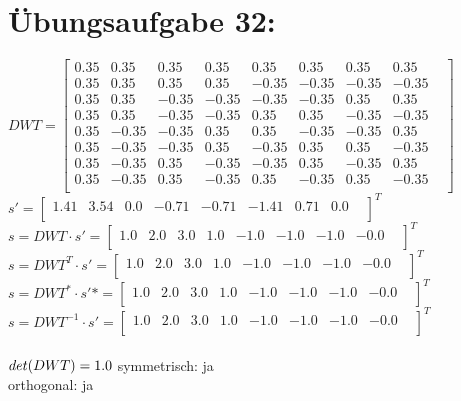 

	\section*{Übungsaufgabe 32:}
	
	$
	DWT =
	\begin{bmatrix}
	0.35 & 0.35 & 0.35 & 0.35 & 0.35 & 0.35 & 0.35 & 0.35 & \\
	0.35 & 0.35 & 0.35 & 0.35 & -0.35 & -0.35 & -0.35 & -0.35 & \\
	0.35 & 0.35 & -0.35 & -0.35 & -0.35 & -0.35 & 0.35 & 0.35 & \\
	0.35 & 0.35 & -0.35 & -0.35 & 0.35 & 0.35 & -0.35 & -0.35 & \\
	0.35 & -0.35 & -0.35 & 0.35 & 0.35 & -0.35 & -0.35 & 0.35 & \\
	0.35 & -0.35 & -0.35 & 0.35 & -0.35 & 0.35 & 0.35 & -0.35 & \\
	0.35 & -0.35 & 0.35 & -0.35 & -0.35 & 0.35 & -0.35 & 0.35 & \\
	0.35 & -0.35 & 0.35 & -0.35 & 0.35 & -0.35 & 0.35 & -0.35 & \\
	\end{bmatrix}
	$ \\ $
	s' =
	\begin{bmatrix}
	1.41 & 3.54 & 0.0 & -0.71 & -0.71 & -1.41 & 0.71 & 0.0 & \\
	\end{bmatrix}
	^T $ \\ $
	s = DWT \cdot s' =
	\begin{bmatrix}
	1.0 & 2.0 & 3.0 & 1.0 & -1.0 & -1.0 & -1.0 & -0.0 & \\
	\end{bmatrix}
	^T $ \\ $
	s = DWT^T \cdot s' =
	\begin{bmatrix}
	1.0 & 2.0 & 3.0 & 1.0 & -1.0 & -1.0 & -1.0 & -0.0 & \\
	\end{bmatrix}
	^T $ \\ $
	s = DWT^* \cdot s'* =
	\begin{bmatrix}
	1.0 & 2.0 & 3.0 & 1.0 & -1.0 & -1.0 & -1.0 & -0.0 & \\
	\end{bmatrix}
	^T $ \\ $
	s = DWT^{-1} \cdot s' =
	\begin{bmatrix}
	1.0 & 2.0 & 3.0 & 1.0 & -1.0 & -1.0 & -1.0 & -0.0 & \\
	\end{bmatrix}
	^T $ \\\\
	$
	det(DWT) = 1.0\\
	$
	symmetrisch: ja \\
	orthogonal: ja

